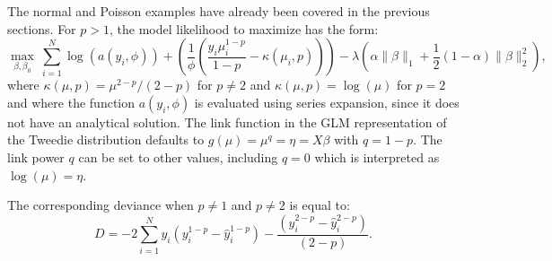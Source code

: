 The normal and Poisson examples have already been covered in the previous sections. For $p>1$, the model likelihood to maximize has the form: 
$$  \max_{\beta,\beta_0} \ \sum_{i=1}^N \log(a(y_i,\phi)) + \left( \frac{1}{\phi}\left( \frac{y_i\mu_i^{1-p}}{1-p} - \kappa(\mu_i,p) \right)  \right) -\lambda  \left(  \alpha \| \beta \|_1 + \frac{1}{2}(1-\alpha)\| \beta \|_2^2  \right), $$
where $\kappa(\mu,p) = \mu^{2-p}/(2-p)$ for $p \neq 2$ and $\kappa(\mu,p) = \log(\mu)$ for $p=2$ and where the function $a(y_i,\phi)$ is evaluated using series expansion, since it does not have an analytical solution. The link function in the GLM representation of the Tweedie distribution defaults to $g(\mu) = \mu^{q} = \eta = X\beta$ with $q=1-p$. The link power $q$ can be set to other values, including $q=0$ which is interpreted as $\log(\mu)=\eta$. 
%

The corresponding deviance when $p \neq 1$ and $p\neq 2$ is equal to:
$$D = -2 \sum_{i=1}^{N} y_i  (y_i^{1-p} - \hat{y}_i^{1-p} ) - \frac{(y_i^{2 - p} - \hat{y}_i^{2 - p})}{(2 - p)}. $$\\

%

%


